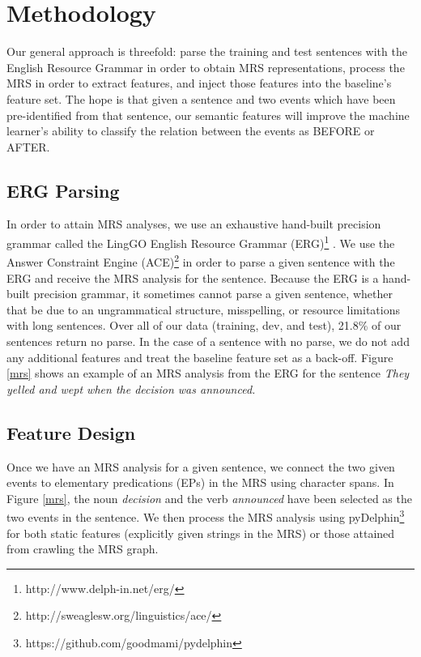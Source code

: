 \documentclass[11pt]{article}
\begin{document}
\section{Methodology}
\label{methodology}

Our general approach is threefold: parse the training and test sentences with the English Resource Grammar \cite{Flickinger:00} in order to obtain MRS representations, process the MRS in order to extract features, and inject those features into the baseline's feature set. The hope is that given a sentence and two events which have been pre-identified from that sentence, our semantic features will improve the machine learner's ability to classify the relation between the events as BEFORE or AFTER.


\subsection{ERG Parsing}

In order to attain MRS analyses, we use an exhaustive hand-built precision grammar called the LingGO English Resource Grammar (ERG)\footnote{http://www.delph-in.net/erg/} \cite{Flickinger:00}. We use the Answer Constraint Engine (ACE)\footnote{http://sweaglesw.org/linguistics/ace/} in order to parse a given sentence with the ERG and receive the MRS analysis for the sentence. Because the ERG is a hand-built precision grammar, it sometimes cannot parse a given sentence, whether that be due to an ungrammatical structure, misspelling, or resource limitations with long sentences. Over all of our data (training, dev, and test), 21.8\% of our sentences return no parse. In the case of a sentence with no parse, we do not add any additional features and treat the baseline feature set as a back-off. Figure \ref{mrs} shows an example of an MRS analysis from the ERG for the sentence \emph{They yelled and wept when the decision was announced.}

\subsection{Feature Design}

Once we have an MRS analysis for a given sentence, we connect the two given events to elementary predications (EPs) in the MRS using character spans. In Figure \ref{mrs}, the noun \emph{decision} and the verb \emph{announced} have been selected as the two events in the sentence. We then process the MRS analysis using pyDelphin\footnote{https://github.com/goodmami/pydelphin} for both static features (explicitly given strings in the MRS) or those attained from crawling the MRS graph.
\end{document}
